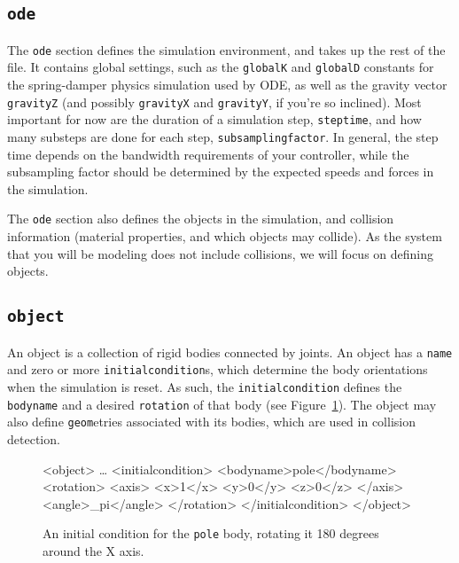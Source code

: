 \documentclass{article}
\newcommand{\txt}[1]{\texttt{#1}}
\newcommand{\tab}{\hspace{3em}}
\newcommand{\xt}[1]{\textcolor{matlab-keyword}{<#1>}}
\newenvironment{code}{\alltt\small}{\endalltt}
\newenvironment{boxedcode}{\begin{boxedminipage}{\linewidth}\begin{code}}{\end{code}\end{boxedminipage}}
\begin{document}
\subsection{\txt{ode}}
The \txt{ode} section defines the simulation environment, and takes up the rest of the file. It contains global settings, such as the \txt{globalK} and \txt{globalD} constants for the spring-damper physics simulation used by ODE, as well as the gravity vector \txt{gravityZ} (and possibly \txt{gravityX} and \txt{gravityY}, if you're so inclined). Most important for now are the duration of a simulation step, \txt{steptime}, and how many substeps are done for each step, \txt{subsamplingfactor}. In general, the step time depends on the bandwidth requirements of your controller, while the subsampling factor should be determined by the expected speeds and forces in the simulation.

The \txt{ode} section also defines the objects in the simulation, and collision information (material properties, and which objects may collide). As the system that you will be modeling does not include collisions, we will focus on defining objects.

\subsection{\txt{object}}

An object is a collection of rigid bodies connected by joints. An object has a \txt{name} and zero or more \txt{initialcondition}s, which determine the body orientations when the simulation is reset. As such, the \txt{initialcondition} defines the \txt{bodyname} and a desired \txt{rotation} of that body (see Figure~\ref{fig:lambda:initialcondition}). The object may also define \txt{geom}etries associated with its bodies, which are used in collision detection.

\begin{figure}[h!]
\begin{boxedcode}
\xt{object}
\tab\ldots
\tab\xt{initialcondition}
\tab\tab\xt{bodyname}pole\xt{/bodyname}
\tab\tab\xt{rotation}
\tab\tab\tab\xt{axis}
\tab\tab\tab\tab\xt{x}1\xt{/x}
\tab\tab\tab\tab\xt{y}0\xt{/y}
\tab\tab\tab\tab\xt{z}0\xt{/z}
\tab\tab\tab\xt{/axis}
\tab\tab\tab\xt{angle}_pi\xt{/angle}
\tab\tab\xt{/rotation}
\tab\xt{/initialcondition}
\xt{/object}
\end{boxedcode}
\caption{An initial condition for the \txt{pole} body, rotating it 180 degrees around the X axis.}
\label{fig:lambda:initialcondition}
\end{figure}
\end{document}
